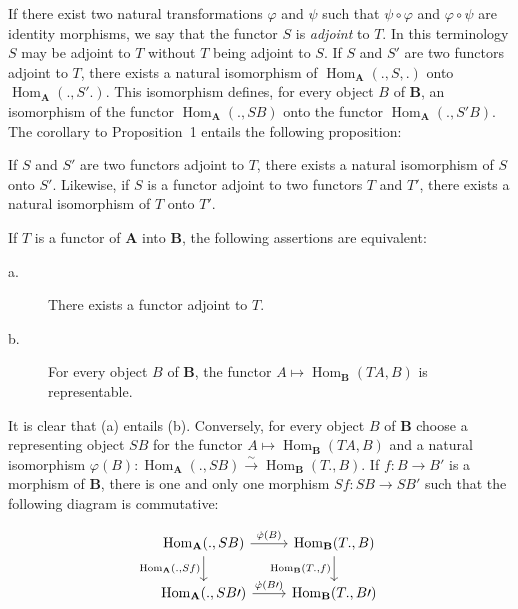 If there exist two natural transformations $\varphi$ and $\psi$ such that
$\psi\circ\varphi$ and $\varphi\circ\psi$ are identity morphisms, we say
that the functor $S$ is \emph{adjoint} to $T$. In this terminology $S$
may be adjoint to $T$ without $T$ being adjoint to $S$. If $S$ and $S'$
are two functors adjoint to $T$, there exists a natural isomorphism of
$\operatorname{Hom}_{\mathbf{A}}(.,S,.)$ onto
$\operatorname{Hom}_{\mathbf{A}}(.,S'.)$. This isomorphism defines, for
every object $B$ of $\mathbf{B}$, an isomorphism of the functor
$\operatorname{Hom}_{\mathbf{A}}(.,SB)$ onto the functor
$\operatorname{Hom}_{\mathbf{A}}(.,S'B)$. The corollary to
Proposition~1 entails the following proposition:

\begin{proposition}\label{prop:uniqueness-of-adjoints}
If $S$ and $S'$ are two functors adjoint to $T$, there exists a natural
isomorphism of $S$ onto $S'$. Likewise, if $S$ is a functor adjoint to
two functors $T$ and $T'$, there exists a natural isomorphism of $T$ onto
$T'$.
\end{proposition}

\begin{proposition}\label{prop:adjunction-representable}
If $T$ is a functor of $\mathbf{A}$ into $\mathbf{B}$, the following
assertions are equivalent:
\begin{description}
\item[\normalfont a.] There exists a functor adjoint to $T$.
\item[\normalfont b.] For every object $B$ of $\mathbf{B}$, the functor
      $A\mapsto\operatorname{Hom}_{\mathbf{B}}(TA,B)$ is representable.
\end{description}
\end{proposition}

It is clear that (a) entails (b). Conversely, for every object $B$ of
$\mathbf{B}$ choose a representing object $SB$ for the functor
$A\mapsto\operatorname{Hom}_{\mathbf{B}}(TA,B)$ and a natural isomorphism
$\varphi(B)\colon\operatorname{Hom}_{\mathbf{A}}(.,SB)\xrightarrow{\sim}
\operatorname{Hom}_{\mathbf{B}}(T.,B)$. If $f\colon B\to B'$ is a
morphism of $\mathbf{B}$, there is one and only one morphism
$Sf\colon SB\to SB'$ such that the following diagram is commutative:

\[
\begin{tikzcd}
\operatorname{Hom}_{\mathbf{A}}(.,SB)
  \arrow[r, "\natt{\varphi}(B)"]
  \arrow[d, "\operatorname{Hom}_{\mathbf{A}}(.{,}Sf)"'] &
\operatorname{Hom}_{\mathbf{B}}(T.,B)
  \arrow[d, "\operatorname{Hom}_{\mathbf{B}}(T.{,}f)"'] \\
\operatorname{Hom}_{\mathbf{A}}(.,SB\prime)
  \arrow[r, "\natt{\varphi}(B\prime)"] &
\operatorname{Hom}_{\mathbf{B}}(T.,B\prime)
\end{tikzcd}
\]

